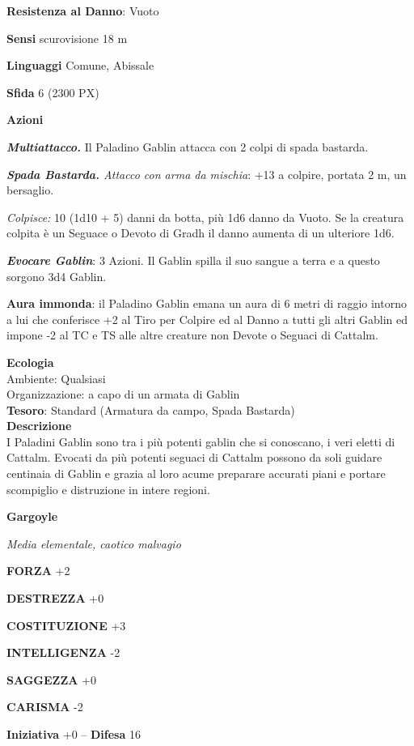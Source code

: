 \begin{multicols}{2}
\textbf{Resistenza al Danno}: Vuoto

\textbf{Sensi} scurovisione 18 m

\textbf{Linguaggi} Comune, Abissale

\textbf{Sfida} 6 (2300 PX)

\textbf{Azioni}

\textit{\textbf{Multiattacco.}} Il Paladino Gablin attacca con 2 colpi di spada bastarda.

\textit{\textbf{Spada Bastarda.} Attacco con arma da mischia}: +13 a colpire, portata 2 m, un bersaglio.

\textit{Colpisce:} 10 (1d10 + 5) danni da botta, più 1d6 danno da Vuoto. Se la creatura colpita è un Seguace o Devoto di Gradh il danno aumenta di un ulteriore 1d6.

\textit{\textbf{Evocare Gablin}}: 3 Azioni. Il Gablin spilla il suo sangue a terra e a questo sorgono 3d4 Gablin.

\textbf{Aura immonda}: il Paladino Gablin emana un aura di 6 metri di raggio intorno a lui che conferisce +2 al Tiro per Colpire ed al Danno a tutti gli altri Gablin ed impone -2 al TC e TS alle altre creature non Devote o Seguaci di Cattalm.

\textbf{Ecologia}\\
Ambiente: Qualsiasi\\
Organizzazione: a capo di un armata di Gablin\\
\textbf{Tesoro}: Standard (Armatura da campo, Spada Bastarda)\\
\textbf{Descrizione}\\
I Paladini Gablin sono tra i più potenti gablin che si conoscano, i veri eletti di Cattalm. Evocati da più potenti seguaci di Cattalm possono da soli guidare centinaia di Gablin e grazia al loro acume preparare accurati piani e portare scompiglio e distruzione in intere regioni.

\medskip{}\textbf{Gargoyle}

\textit{Media elementale, caotico malvagio}

\textbf{FORZA} +2

\textbf{DESTREZZA} +0

\textbf{COSTITUZIONE} +3

\textbf{INTELLIGENZA} -2

\textbf{SAGGEZZA} +0

\textbf{CARISMA} -2

\textbf{Iniziativa} +0 -- \textbf{Difesa} 16


\end{multicols}
